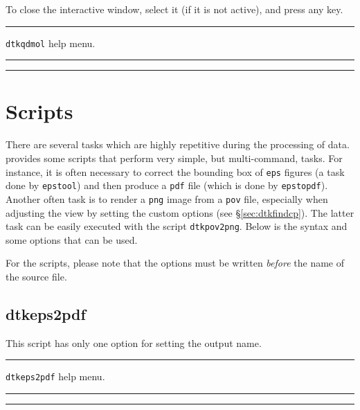 To close the interactive window, select it (if it is not active), and press any key.

\rule{\textwidth}{1pt}
{\center\texttt{dtkqdmol} help menu.\\}
\rule{\textwidth}{1pt}
\begin{footnotesize}
\end{footnotesize}
\rule{\textwidth}{1pt}


\chapter{Scripts}

There are several tasks which are highly repetitive during the processing of data. \DTK{} provides some scripts that perform very simple, but multi-command, tasks. For instance, it is often necessary to correct the bounding box of \texttt{eps} figures (a task done by \texttt{epstool}) and then produce a \texttt{pdf} file (which is done by \texttt{epstopdf}). Another often task is to render a \texttt{png} image from a \texttt{pov} file, especially when adjusting the view by setting the custom options (see \S\ref{sec:dtkfindcp}). The latter task can be easily executed with the script \texttt{dtkpov2png}. Below is the syntax and some options that can be used.

For the scripts, please note that the options must be written \textit{before} the name of the source file.

\section{dtkeps2pdf}

This script has only one option for setting the output name.\\
\rule{\textwidth}{1pt}
{\center\texttt{dtkeps2pdf} help menu.\\}
\rule{\textwidth}{1pt}
\begin{footnotesize}
\end{footnotesize}
\rule{\textwidth}{1pt}

